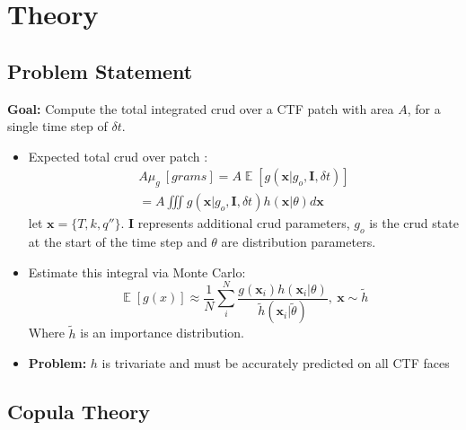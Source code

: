 \documentclass[t, pdftex]{beamer}
\DeclareMathOperator*{\E}{\mathbb{E}}
\begin{document}
\section[Theory]{Theory}
\subsection*{Problem Statement}
\begin{frame}
\textbf{Goal:} Compute the total integrated crud over a CTF patch with area $A$, for a single time step of $\delta t$.
\begin{itemize}
	\item Expected total crud over patch : 
	\begin{eqnarray}
		A \mu_g\ [grams] = A \E[g(\mathbf x|g_o, \mathbf I, \delta t)] \nonumber \\
		= A \iiint g(\mathbf x|g_o, \mathbf I, \delta t) h(\mathbf x|\theta) d \mathbf x  \nonumber
	\end{eqnarray}
	let $\mathbf x= \{T, k, q''\}$.
	$\mathbf I$ represents additional crud parameters, $g_o$ is the crud state at the start of the time step and $\theta$ are distribution parameters.
	\item Estimate this integral via Monte Carlo:
	\[
	\E[g(x)] \approx \frac{1}{N} \sum_i^N \frac{g(\mathbf x_i) 
	h(\mathbf x_i | \theta)}{\tilde h(\mathbf x_i | \tilde \theta)}, \ \mathbf x \sim \tilde h
	\]
	Where $\tilde h$ is an importance distribution. 
    \item \textbf{Problem:} $h$ is trivariate and must be accurately predicted on all CTF faces
\end{itemize}
\end{frame}


\subsection*{Copula Theory}
\end{document}
